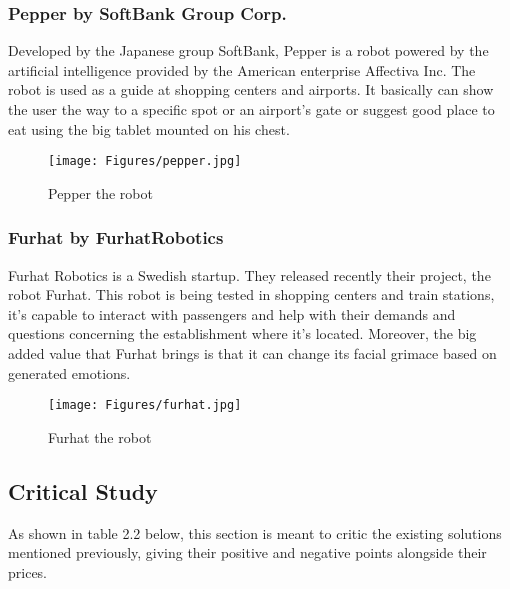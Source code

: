 \subsubsection{Pepper by SoftBank Group Corp.}
Developed by the Japanese group SoftBank, Pepper is a robot powered by the artificial intelligence provided by the American enterprise Affectiva Inc. The robot is used as a guide at shopping centers and airports. It basically can show the user the way to a specific spot or an airport's gate or suggest good place to eat using the big tablet mounted on his chest.
\begin{figure}[H]
\centering
\texttt{[image: Figures/pepper.jpg]}
\caption{Pepper the robot}
\label{fig:pepper}
\end{figure}
\subsubsection{Furhat by FurhatRobotics}
Furhat Robotics is a Swedish startup. They released recently their project, the robot Furhat. This robot is being tested in shopping centers and train stations, it's capable to interact with passengers and help with their demands and questions concerning the establishment where it's located. Moreover, the big added value that Furhat brings is that it can change its facial grimace based on generated emotions.
\begin{figure}[H]
\centering
\texttt{[image: Figures/furhat.jpg]}
\caption{Furhat the robot}
\label{fig:furhat}
\end{figure}
\subsection{Critical Study}
As shown in table 2.2 below, this section is meant to critic the existing solutions mentioned previously, giving their positive and negative points alongside their prices.

